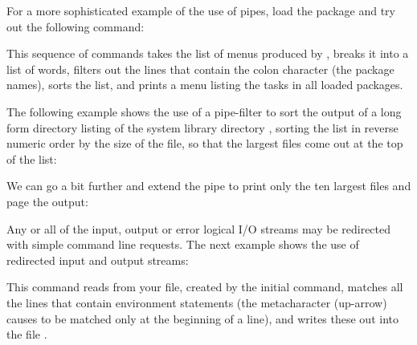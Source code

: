 \begin{quotation}\noindent
{} 
\end{quotation}

\noindent
For a more sophisticated example of the use of pipes, load the
 package and try out the following command:

\begin{quotation}\noindent
{} 
\end{quotation}

\noindent
This sequence of commands takes the list of menus produced by ,
breaks it into a list of words, filters out the lines that contain the colon
character (the package names), sorts the list, and prints a menu listing the
tasks in all loaded packages.

The following example shows the use of a pipe-filter to sort the output
of a long form directory listing of the system library directory ,
sorting the list in reverse numeric order by the size of the file, so that
the largest files come out at the top of the list:

\begin{quotation}\noindent
{} 
\end{quotation}

\noindent
We can go a bit further and extend the pipe to print only the ten largest
files and page the output:

\begin{quotation}\noindent
{} 
\end{quotation}

Any or all of the input, output or error logical I/O streams may be
redirected with simple command line requests.  The next example shows
the use of redirected input and output streams:

\begin{quotation}\noindent
{} 
\end{quotation}

\noindent
This command reads from your  file, created by the
initial  command, matches all the lines that contain
 environment statements (the metacharacter \upa (up-arrow)
causes  to be matched only at the beginning of a line),
and writes these out into the file .

